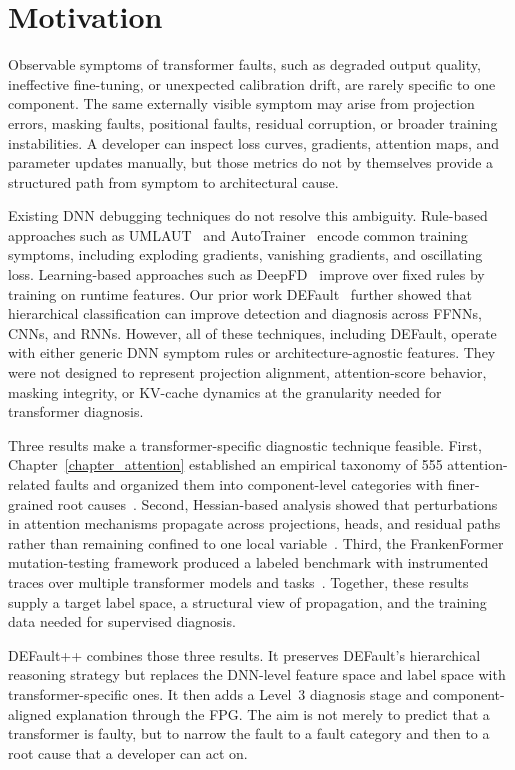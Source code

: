 \section{Motivation}
\label{sec:defaultpp_introduction}

Observable symptoms of transformer faults, such as degraded output quality, ineffective fine-tuning, or unexpected calibration drift, are rarely specific to one component. The same externally visible symptom may arise from projection errors, masking faults, positional faults, residual corruption, or broader training instabilities. A developer can inspect loss curves, gradients, attention maps, and parameter updates manually, but those metrics do not by themselves provide a structured path from symptom to architectural cause.

Existing DNN debugging techniques do not resolve this ambiguity. Rule-based approaches such as UMLAUT~\cite{umlaut} and AutoTrainer~\cite{autotrainer} encode common training symptoms, including exploding gradients, vanishing gradients, and oscillating loss. Learning-based approaches such as DeepFD~\cite{deepfd} improve over fixed rules by training on runtime features. Our prior work DEFault~\cite{default} further showed that hierarchical classification can improve detection and diagnosis across FFNNs, CNNs, and RNNs. However, all of these techniques, including DEFault, operate with either generic DNN symptom rules or architecture-agnostic features. They were not designed to represent projection alignment, attention-score behavior, masking integrity, or KV-cache dynamics at the granularity needed for transformer diagnosis.

Three results make a transformer-specific diagnostic technique feasible. First, Chapter~\ref{chapter_attention} established an empirical taxonomy of 555 attention-related faults and organized them into component-level categories with finer-grained root causes~\cite{attention_taxonomy}. Second, Hessian-based analysis showed that perturbations in attention mechanisms propagate across projections, heads, and residual paths rather than remaining confined to one local variable~\cite{hessian_analysis}. Third, the FrankenFormer mutation-testing framework produced a labeled benchmark with instrumented traces over multiple transformer models and tasks~\cite{frankenformer}. Together, these results supply a target label space, a structural view of propagation, and the training data needed for supervised diagnosis.

DEFault++ combines those three results. It preserves DEFault's hierarchical reasoning strategy but replaces the DNN-level feature space and label space with transformer-specific ones. It then adds a Level~3 diagnosis stage and component-aligned explanation through the FPG. The aim is not merely to predict that a transformer is faulty, but to narrow the fault to a fault category and then to a root cause that a developer can act on.

